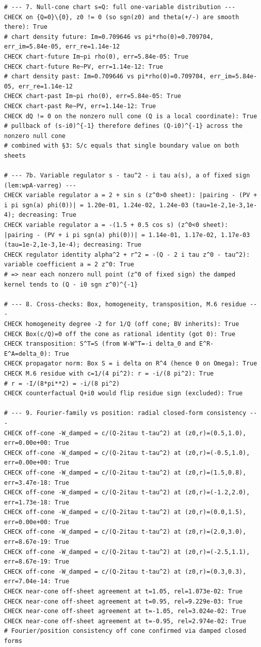 \documentclass{article}
\theoremstyle{remark}
\begin{document}
\begin{lstlisting}
# --- 7. Null-cone chart s=Q: full one-variable distribution ---
CHECK on {Q=0}\{0}, z0 != 0 (so sgn(z0) and theta(+/-) are smooth there): True
# chart density future: Im=0.709646 vs pi*rho(0)=0.709704, err_im=5.84e-05, err_re=1.14e-12
CHECK chart-future Im~pi rho(0), err=5.84e-05: True
CHECK chart-future Re~PV, err=1.14e-12: True
# chart density past: Im=0.709646 vs pi*rho(0)=0.709704, err_im=5.84e-05, err_re=1.14e-12
CHECK chart-past Im~pi rho(0), err=5.84e-05: True
CHECK chart-past Re~PV, err=1.14e-12: True
CHECK dQ != 0 on the nonzero null cone (Q is a local coordinate): True
# pullback of (s-i0)^{-1} therefore defines (Q-i0)^{-1} across the nonzero null cone
# combined with §3: S/c equals that single boundary value on both sheets

# --- 7b. Variable regulator s - tau^2 - i tau a(s), a of fixed sign (lem:wpA-varreg) ---
CHECK variable regulator a = 2 + sin s (z^0>0 sheet): |pairing - (PV + i pi sgn(a) phi(0))| = 1.20e-01, 1.24e-02, 1.24e-03 (tau=1e-2,1e-3,1e-4); decreasing: True
CHECK variable regulator a = -(1.5 + 0.5 cos s) (z^0<0 sheet): |pairing - (PV + i pi sgn(a) phi(0))| = 1.14e-01, 1.17e-02, 1.17e-03 (tau=1e-2,1e-3,1e-4); decreasing: True
CHECK regulator identity alpha^2 + r^2 = -(Q - 2 i tau z^0 - tau^2): variable coefficient a = 2 z^0: True
# => near each nonzero null point (z^0 of fixed sign) the damped kernel tends to (Q - i0 sgn z^0)^{-1}

# --- 8. Cross-checks: Box, homogeneity, transposition, M.6 residue ---
CHECK homogeneity degree -2 for 1/Q (off cone; BV inherits): True
CHECK Box(c/Q)=0 off the cone as rational identity (got 0): True
CHECK transposition: S^T=S (from W-W^T=-i delta_0 and E^R-E^A=delta_0): True
CHECK propagator norm: Box S = i delta on R^4 (hence 0 on Omega): True
CHECK M.6 residue with c=1/(4 pi^2): r = -i/(8 pi^2): True
# r = -I/(8*pi**2) = -i/(8 pi^2)
CHECK counterfactual Q+i0 would flip residue sign (excluded): True

# --- 9. Fourier-family vs position: radial closed-form consistency ---
CHECK off-cone -W_damped = c/(Q-2itau t-tau^2) at (z0,r)=(0.5,1.0), err=0.00e+00: True
CHECK off-cone -W_damped = c/(Q-2itau t-tau^2) at (z0,r)=(-0.5,1.0), err=0.00e+00: True
CHECK off-cone -W_damped = c/(Q-2itau t-tau^2) at (z0,r)=(1.5,0.8), err=3.47e-18: True
CHECK off-cone -W_damped = c/(Q-2itau t-tau^2) at (z0,r)=(-1.2,2.0), err=1.73e-18: True
CHECK off-cone -W_damped = c/(Q-2itau t-tau^2) at (z0,r)=(0.0,1.5), err=0.00e+00: True
CHECK off-cone -W_damped = c/(Q-2itau t-tau^2) at (z0,r)=(2.0,3.0), err=8.67e-19: True
CHECK off-cone -W_damped = c/(Q-2itau t-tau^2) at (z0,r)=(-2.5,1.1), err=8.67e-19: True
CHECK off-cone -W_damped = c/(Q-2itau t-tau^2) at (z0,r)=(0.3,0.3), err=7.04e-14: True
CHECK near-cone off-sheet agreement at t=1.05, rel=1.073e-02: True
CHECK near-cone off-sheet agreement at t=0.95, rel=9.229e-03: True
CHECK near-cone off-sheet agreement at t=-1.05, rel=3.024e-02: True
CHECK near-cone off-sheet agreement at t=-0.95, rel=2.974e-02: True
# Fourier/position consistency off cone confirmed via damped closed forms


\end{lstlisting}
\end{document}
